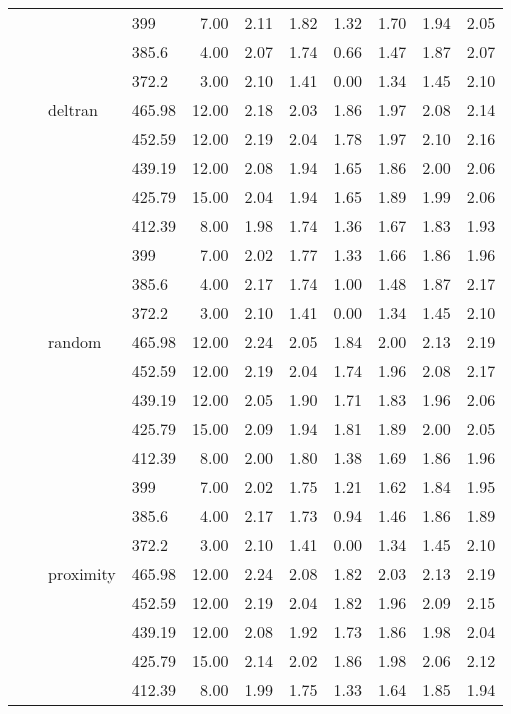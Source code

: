 \begin{longtable}{llllrrrrrrr}
   &  &  & 399 & 7.00 & 2.11 & 1.82 & 1.32 & 1.70 & 1.94 & 2.05 \\ 
   &  &  & 385.6 & 4.00 & 2.07 & 1.74 & 0.66 & 1.47 & 1.87 & 2.07 \\ 
   &  &  & 372.2 & 3.00 & 2.10 & 1.41 & 0.00 & 1.34 & 1.45 & 2.10 \\ 
   &  & deltran & 465.98 & 12.00 & 2.18 & 2.03 & 1.86 & 1.97 & 2.08 & 2.14 \\ 
   &  &  & 452.59 & 12.00 & 2.19 & 2.04 & 1.78 & 1.97 & 2.10 & 2.16 \\ 
   &  &  & 439.19 & 12.00 & 2.08 & 1.94 & 1.65 & 1.86 & 2.00 & 2.06 \\ 
   &  &  & 425.79 & 15.00 & 2.04 & 1.94 & 1.65 & 1.89 & 1.99 & 2.06 \\ 
   &  &  & 412.39 & 8.00 & 1.98 & 1.74 & 1.36 & 1.67 & 1.83 & 1.93 \\ 
   &  &  & 399 & 7.00 & 2.02 & 1.77 & 1.33 & 1.66 & 1.86 & 1.96 \\ 
   &  &  & 385.6 & 4.00 & 2.17 & 1.74 & 1.00 & 1.48 & 1.87 & 2.17 \\ 
   &  &  & 372.2 & 3.00 & 2.10 & 1.41 & 0.00 & 1.34 & 1.45 & 2.10 \\ 
   &  & random & 465.98 & 12.00 & 2.24 & 2.05 & 1.84 & 2.00 & 2.13 & 2.19 \\ 
   &  &  & 452.59 & 12.00 & 2.19 & 2.04 & 1.74 & 1.96 & 2.08 & 2.17 \\ 
   &  &  & 439.19 & 12.00 & 2.05 & 1.90 & 1.71 & 1.83 & 1.96 & 2.06 \\ 
   &  &  & 425.79 & 15.00 & 2.09 & 1.94 & 1.81 & 1.89 & 2.00 & 2.05 \\ 
   &  &  & 412.39 & 8.00 & 2.00 & 1.80 & 1.38 & 1.69 & 1.86 & 1.96 \\ 
   &  &  & 399 & 7.00 & 2.02 & 1.75 & 1.21 & 1.62 & 1.84 & 1.95 \\ 
   &  &  & 385.6 & 4.00 & 2.17 & 1.73 & 0.94 & 1.46 & 1.86 & 1.89 \\ 
   &  &  & 372.2 & 3.00 & 2.10 & 1.41 & 0.00 & 1.34 & 1.45 & 2.10 \\ 
   &  & proximity & 465.98 & 12.00 & 2.24 & 2.08 & 1.82 & 2.03 & 2.13 & 2.19 \\ 
   &  &  & 452.59 & 12.00 & 2.19 & 2.04 & 1.82 & 1.96 & 2.09 & 2.15 \\ 
   &  &  & 439.19 & 12.00 & 2.08 & 1.92 & 1.73 & 1.86 & 1.98 & 2.04 \\ 
   &  &  & 425.79 & 15.00 & 2.14 & 2.02 & 1.86 & 1.98 & 2.06 & 2.12 \\ 
   &  &  & 412.39 & 8.00 & 1.99 & 1.75 & 1.33 & 1.64 & 1.85 & 1.94 \\ 

\end{longtable}
